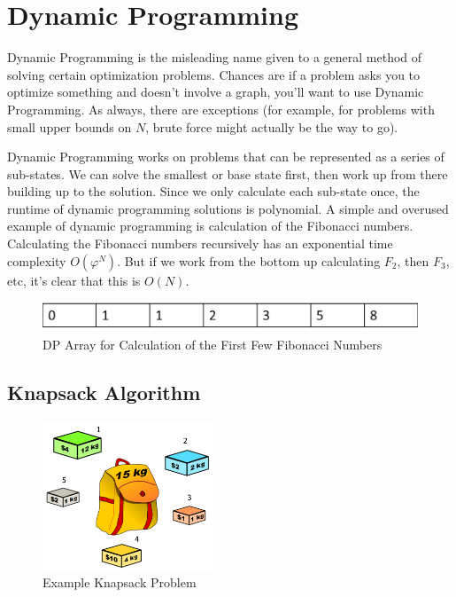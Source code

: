\chapter{Dynamic Programming}

Dynamic Programming is the misleading name given to a general method of solving certain optimization problems.  Chances are if a problem asks you to optimize something and doesn't involve a graph, you'll want to use Dynamic Programming.  As always, there are exceptions  (for example, for problems with small upper bounds on $N$, brute force might actually be the way to go).

Dynamic Programming works on problems that can be represented as a series of sub-states.  We can solve the smallest or base state first, then work up from there building up to the solution.  Since we only calculate each sub-state once, the runtime of dynamic programming solutions is polynomial.
%
A simple and overused example of dynamic programming is calculation of the Fibonacci numbers.  Calculating the Fibonacci numbers recursively has an exponential time complexity $O(\varphi^N)$.  But if we work from the bottom up calculating $F_2$, then $F_3$, etc, it's clear that this is $O(N)$.
%
\begin{figure}[h]
\begin{center}
\includegraphics[width=6in]{images/fib-dp.png}
\end{center}
\caption{DP Array for Calculation of the First Few Fibonacci Numbers}
\end{figure}

\section{Knapsack Algorithm}

\begin{figure}[ht]
\begin{center}
\includegraphics[width=2in]{images/knapsack.png}
\end{center}
\caption{Example Knapsack Problem}
\label{fig:ihatelarry}
\end{figure}

